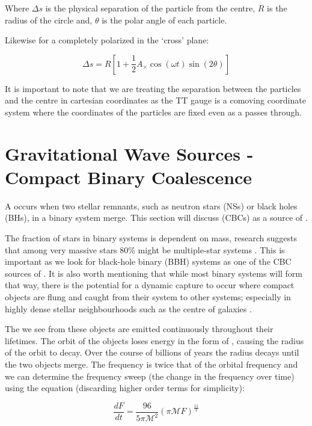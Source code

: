 Where $\Delta s$ is the physical separation of the particle from the centre, $R$ is the radius of the circle and, $\theta$ is the polar angle of each particle.

Likewise for a \gw completely polarized in the `cross' plane:

\begin{equation}
   \Delta s = R[1 + \frac{1}{2} A_{\times} \cos(\omega t) \sin(2 \theta)]
   \label{eqn:cross_separation}
\end{equation}

It is important to note that we are treating the separation between the particles and the centre in cartesian coordinates as the TT gauge is a comoving coordinate system where the coordinates of the particles are fixed
even as a \gw passes through.

\section{\label{sec:CBC}Gravitational Wave Sources - Compact Binary Coalescence}

A \cbc occurs when two stellar remnants, such as neutron stars (NSs) or black holes (BHs), in a binary system merge. This section will discuss \cbcs (CBCs) as a source of \gws.

The fraction of stars in binary systems is dependent on mass, research suggests that among very massive stars 80\% might be multiple-star systems \cite{binary_fraction}. This is important as we look for black-hole binary (BBH) systems as one of the CBC sources of \gws. It is also worth mentioning that while most binary systems will form that way, there is the potential for a dynamic capture to occur where compact objects are flung and caught from
their system to other systems; especially in highly dense stellar neighbourhoods such as the centre of galaxies \cite{dynamic_capture}.

The \gws we see from these objects are emitted continuously throughout their lifetimes. The orbit of the objects loses energy in the form of \gws, causing the radius of the orbit to decay. Over the course of billions of years the radius decays until the two objects merge. The \gw frequency is twice that of the orbital frequency \cite{kip_book} and we can determine the frequency sweep (the change in the frequency over time) using the equation (discarding higher order terms for simplicity):

\begin{equation}
   \frac{dF}{dt} = \frac{96}{5 \pi \mathcal{M}^2} (\pi \mathcal{M} F)^{\frac{11}{3}}
   \label{eqn:frequency_sweep}
\end{equation}

